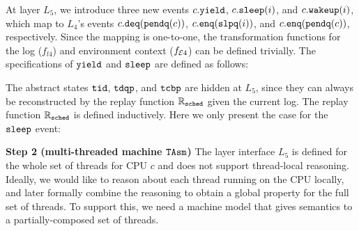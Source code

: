 {At layer $L_5$, we introduce three new events
$c.\yield$, $c.\sleep(i)$, and $c.\wakeup(i)$,
which map to $L_4$'s events
$c.\deq(\comm{pendq}(c))$,
$c.\enq(\comm{slpq}(i))$,
and $c.\enq(\comm{pendq}(c))$, respectively.
Since the mapping is one-to-one, the transformation functions for
the log ($f_{l4}$) and environment context ($f_{\oracle4}$)
can be defined trivially.
The specifications of $\yield$ and $\sleep$
are defined as follows:
\begin{mathpar}
\end{mathpar}%
The abstract states $\comm{tid}$,
$\comm{tdqp}$, and $\comm{tcbp}$
are hidden at $L_5$, since they can always be reconstructed
by the replay function $\replay_{\comm{sched}}$ given the current log.
The replay function $\replay_{\comm{sched}}$
is defined inductively.
Here we only present the case for the $\sleep$ event:
\begin{mathpar}
\end{mathpar}%
\noindent\textbf{Step 2 (multi-threaded machine $\TAsm$)} 
The  layer interface $L_5$ is defined for the whole
set of threads for CPU $c$ and does not support thread-local reasoning.
Ideally, we would like to reason about each thread running on the CPU 
locally, and later formally combine the reasoning to obtain a global
property for the full set of threads.
To support this, we need a machine model that gives semantics to
a partially-composed set of threads.

}
